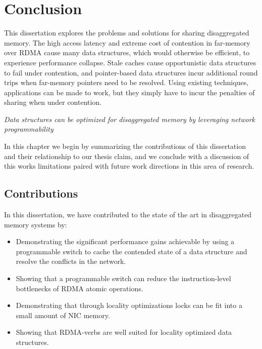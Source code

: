 \documentclass[12pt]{ucsddissertation}
\begin{document}
\chapter{Conclusion}

This dissertation explores the problems and solutions for sharing disaggregated memory. The high
access latency and extreme cost of contention in far-memory over RDMA cause many data structures,
which would otherwise be efficient, to experience performance collapse. Stale caches cause
opportunistic data structures to fail under contention, and pointer-based data structures incur
additional round trips when far-memory pointers need to be resolved. Using existing techniques,
applications can be made to work, but they simply have to incur the penalties of sharing when under
contention.

\begin{center}
\textit{Data structures can be optimized for disaggregated memory by leveraging network programmability} \\
\end{center}


In this chapter we begin by summarizing the contributions of this dissertation and their
relationship to our thesis claim, and we conclude with a discussion of this works limitations paired
with future work directions in this area of research.

\section{Contributions}

In this dissertation, we have contributed to the state of the art in disaggregated memory systems by:

\begin{itemize}
    \item Demonstrating the significant performance gains achievable by using a programmable switch to cache the contended state of a data structure and resolve the conflicts in the network.
    \item Showing that a programmable switch can reduce the instruction-level bottlenecks of RDMA atomic operations.
    \item Demonstrating that through locality optimizations locks can be fit into a small amount of NIC memory.
    \item Showing that RDMA-verbs are well suited for locality optimized data structures.
\end{itemize}
\end{document}
